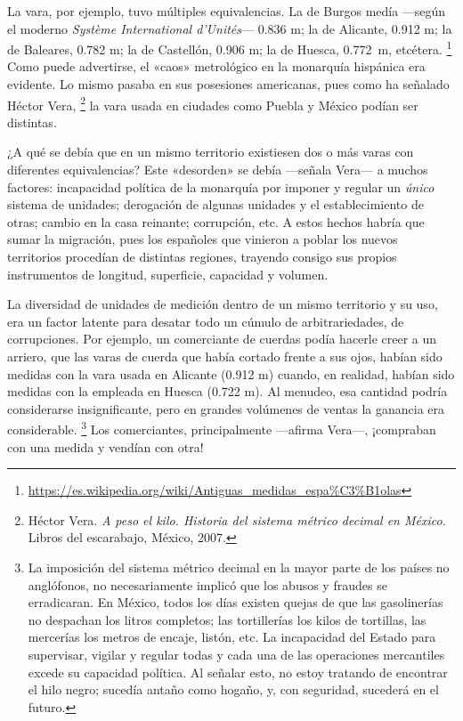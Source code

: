 \documentclass[14pt,twoside,final]{extbook} %
\let\oldfootnote\footnote
\renewcommand\footnote[1]{%
\oldfootnote{\hspace{1mm}#1}}
\begin{document}
La vara, por ejemplo, tuvo múltiples equivalencias. La de Burgos medía ---según el moderno \emph{Système International d'\/Unités}--- 0.836 m; la de Alicante, 0.912 m; la de Baleares, 0.782 m; la de Castellón, 0.906 m; la de Huesca, 0.772~m, etcétera.\footnote{\url{https://es.wikipedia.org/wiki/Antiguas_medidas_espa\%C3\%B1olas}} Como puede advertirse, el «caos» metrológico en la monarquía hispánica era evidente. Lo mismo pasaba en sus posesiones americanas, pues como ha señalado Héctor Vera,\footnote{Héctor Vera. \emph{A peso el kilo. Historia del sistema métrico decimal en México.} Libros del escarabajo, México, 2007.} la vara usada en ciudades como Puebla y México podían ser distintas.

¿A qué se debía que en un mismo territorio existiesen dos o más varas con diferentes equivalencias? Este «desorden» se debía ---señala Vera--- a muchos factores: incapacidad política de la monarquía por imponer y regular un \emph{único} sistema de unidades; derogación de algunas unidades y el
establecimiento de otras; cambio en la casa reinante; corrupción, etc. A estos hechos habría que sumar la migración, pues los españoles que vinieron a poblar los nuevos territorios procedían de distintas regiones, trayendo consigo sus propios instrumentos de longitud, superficie, capacidad y volumen.

La diversidad de unidades de medición dentro de un mismo territorio y su uso, era un factor latente para desatar todo un cúmulo de arbitrariedades, de corrupciones. Por ejemplo, un comerciante de cuerdas podía hacerle creer a un arriero, que las varas de cuerda que había cortado frente a sus ojos, habían sido medidas con la vara usada en Alicante (0.912 m) cuando, en realidad, habían sido medidas con la empleada en Huesca (0.722 m). Al menudeo, esa cantidad podría considerarse insignificante, pero en grandes volúmenes de ventas la ganancia era considerable.\footnote{La imposición del sistema métrico decimal en la mayor parte de los países no anglófonos, no necesariamente implicó que los abusos y fraudes se erradicaran. En México, todos los días existen quejas de que las gasolinerías no despachan los litros completos; las tortillerías los kilos de tortillas, las mercerías los metros de encaje, listón, etc. La incapacidad del Estado para supervisar, vigilar y regular todas y cada una de las operaciones mercantiles excede su
capacidad política. Al señalar esto, no estoy tratando de encontrar el hilo negro; sucedía antaño como hogaño, y, con seguridad, sucederá en el futuro.} Los comerciantes, principalmente ---afirma Vera---, ¡compraban con una medida y vendían con otra!
\end{document}
